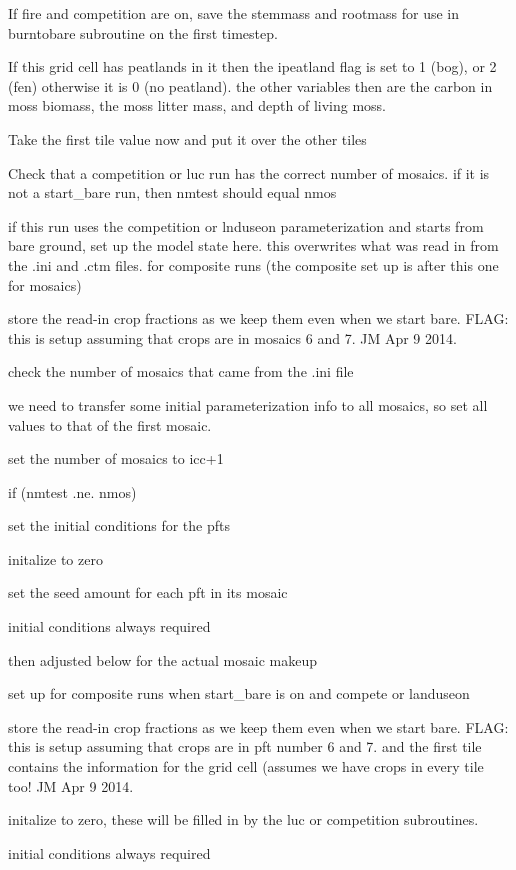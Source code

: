 If fire and competition are on, save the stemmass and rootmass for use in burntobare subroutine on the first timestep.

If this grid cell has peatlands in it then the ipeatland flag is set to 1 (bog), or 2 (fen) otherwise it is 0 (no peatland). the other variables then are the carbon in moss biomass, the moss litter mass, and depth of living moss.

Take the first tile value now and put it over the other tiles

Check that a competition or luc run has the correct number of mosaics. if it is not a start\+\_\+bare run, then nmtest should equal nmos

if this run uses the competition or lnduseon parameterization and starts from bare ground, set up the model state here. this overwrites what was read in from the .ini and .ctm files. for composite runs (the composite set up is after this one for mosaics)

store the read-\/in crop fractions as we keep them even when we start bare. F\+L\+A\+G\+: this is setup assuming that crops are in mosaics 6 and 7. J\+M Apr 9 2014.

check the number of mosaics that came from the .ini file

we need to transfer some initial parameterization info to all mosaics, so set all values to that of the first mosaic.

set the number of mosaics to icc+1

if (nmtest .ne. nmos)

set the initial conditions for the pfts

initalize to zero

set the seed amount for each pft in its mosaic

initial conditions always required

then adjusted below for the actual mosaic makeup

set up for composite runs when start\+\_\+bare is on and compete or landuseon

store the read-\/in crop fractions as we keep them even when we start bare. F\+L\+A\+G\+: this is setup assuming that crops are in pft number 6 and 7. and the first tile contains the information for the grid cell (assumes we have crops in every tile too! J\+M Apr 9 2014.

initalize to zero, these will be filled in by the luc or competition subroutines.

initial conditions always required 